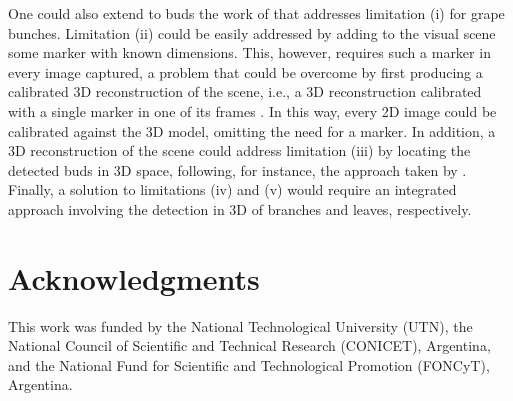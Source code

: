 \documentclass[a4paper,authoryear,review]{elsarticle}
\begin{document}
	One could also extend to buds the work of \citet{santos2020grape} that addresses limitation (i) for grape bunches. Limitation (ii) could be easily addressed by adding to the visual scene some marker with known dimensions. This, however, requires such a marker in every image captured, a problem that could be overcome by first producing a calibrated 3D reconstruction of the scene, i.e., a 3D reconstruction calibrated with a single marker in one of its frames \citep{hartley2003multiple, moons20093d}. In this way, every 2D image could be calibrated against the 3D model, omitting the need for a marker. In addition, a 3D reconstruction of the scene could address limitation (iii) by locating the detected buds in 3D space, following, for instance, the approach taken by \citet{diaz2018grapevine}. Finally, a solution to limitations (iv) and (v) would require an integrated approach involving the detection in 3D of branches and leaves, respectively. 
	
	\section*{Acknowledgments}
	
	This work was funded by the National Technological University (UTN), the National Council of Scientific and Technical Research (CONICET), Argentina, and the National Fund for Scientific and Technological Promotion (FONCyT), Argentina.
	
	
	
\end{document}
